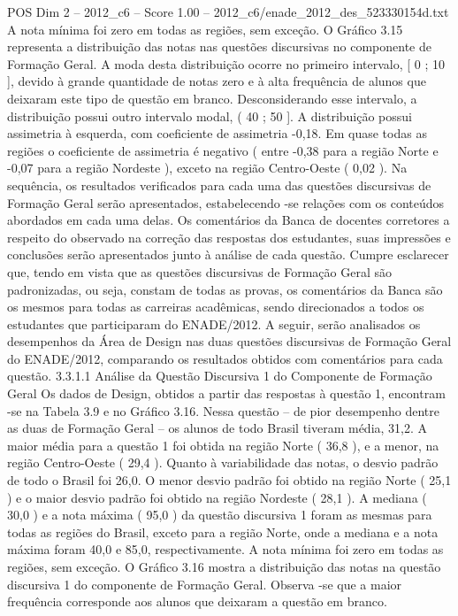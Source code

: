 \begin{textsample}{POS Dim 2 – 2012\_c6 – Score 1.00 – 2012\_c6/enade\_2012\_des\_523330154d.txt}
A nota mínima foi zero em todas as regiões, sem exceção.
O Gráfico 3.15 representa a distribuição das notas nas questões discursivas no componente de Formação Geral.
A moda desta distribuição ocorre no primeiro intervalo, [ 0 ; 10 ], devido à grande quantidade de notas zero e à alta frequência de alunos que deixaram este tipo de questão em branco.
Desconsiderando esse intervalo, a distribuição possui outro intervalo modal, ( 40 ; 50 ].
A distribuição possui assimetria à esquerda, com coeficiente de assimetria -0,18.
Em quase todas as regiões o coeficiente de assimetria é negativo ( entre -0,38 para a região Norte e -0,07 para a região Nordeste ), exceto na região Centro-Oeste ( 0,02 ).
Na sequência, os resultados verificados para cada uma das questões discursivas de Formação Geral serão apresentados, estabelecendo -se relações com os conteúdos abordados em cada uma delas.
Os comentários da Banca de docentes corretores a respeito do observado na correção das respostas dos estudantes, suas impressões e conclusões serão apresentados junto à análise de cada questão.
Cumpre esclarecer que, tendo em vista que as questões discursivas de Formação Geral são padronizadas, ou seja, constam de todas as provas, os comentários da Banca são os mesmos para todas as carreiras acadêmicas, sendo direcionados a todos os estudantes que participaram do ENADE/2012.
A seguir, serão analisados os desempenhos da Área de Design nas duas questões discursivas de Formação Geral do ENADE/2012, comparando os resultados obtidos com comentários para cada questão. 3.3.1.1 Análise da Questão Discursiva 1 do Componente de Formação Geral Os dados de Design, obtidos a partir das respostas à questão 1, encontram -se na Tabela 3.9 e no Gráfico 3.16.
Nessa questão – de pior desempenho dentre as duas de Formação Geral – os alunos de todo Brasil tiveram média, 31,2.
A maior média para a questão 1 foi obtida na região Norte ( 36,8 ), e a menor, na região Centro-Oeste ( 29,4 ).
Quanto à variabilidade das notas, o desvio padrão de todo o Brasil foi 26,0.
O menor desvio padrão foi obtido na região Norte ( 25,1 ) e o maior desvio padrão foi obtido na região Nordeste ( 28,1 ).
A mediana ( 30,0 ) e a nota máxima ( 95,0 ) da questão discursiva 1 foram as mesmas para todas as regiões do Brasil, exceto para a região Norte, onde a mediana e a nota máxima foram 40,0 e 85,0, respectivamente.
A nota mínima foi zero em todas as regiões, sem exceção.
O Gráfico 3.16 mostra a distribuição das notas na questão discursiva 1 do componente de Formação Geral.
Observa -se que a maior frequência corresponde aos alunos que deixaram a questão em branco.

\end{textsample}

